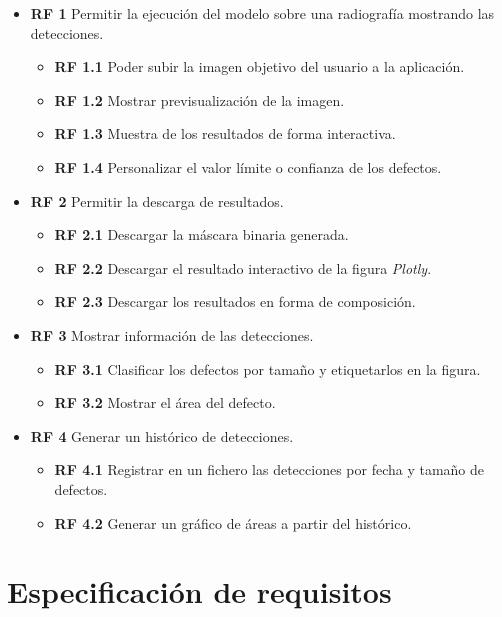 \begin{itemize}
    \item \textbf{RF 1} Permitir la ejecución del modelo sobre una radiografía mostrando las detecciones.
    \begin{itemize}
	    \item \textbf{RF 1.1} Poder subir la imagen objetivo del usuario a la aplicación.
	    \item \textbf{RF 1.2} Mostrar previsualización de la imagen.
	    \item \textbf{RF 1.3} Muestra de los resultados de forma interactiva.
	    \item \textbf{RF 1.4} Personalizar el valor límite o confianza de los defectos.
	\end{itemize}

	\item \textbf{RF 2} Permitir la descarga de resultados.
    \begin{itemize}
	    \item \textbf{RF 2.1} Descargar la máscara binaria generada.
	    \item \textbf{RF 2.2} Descargar el resultado interactivo de la figura \emph{Plotly}.
	    \item \textbf{RF 2.3} Descargar los resultados en forma de composición.
	\end{itemize}
	
	\item \textbf{RF 3} Mostrar información de las detecciones.
    \begin{itemize}
	    \item \textbf{RF 3.1} Clasificar los defectos por tamaño y etiquetarlos en la figura.
	    \item \textbf{RF 3.2} Mostrar el área del defecto.
	\end{itemize}
	
	\item \textbf{RF 4} Generar un histórico de detecciones.
    \begin{itemize}
	    \item \textbf{RF 4.1} Registrar en un fichero las detecciones por fecha y tamaño de defectos.
	    \item \textbf{RF 4.2} Generar un gráfico de áreas a partir del histórico.
	\end{itemize}

\end{itemize}

\clearpage

\section{Especificación de requisitos}

